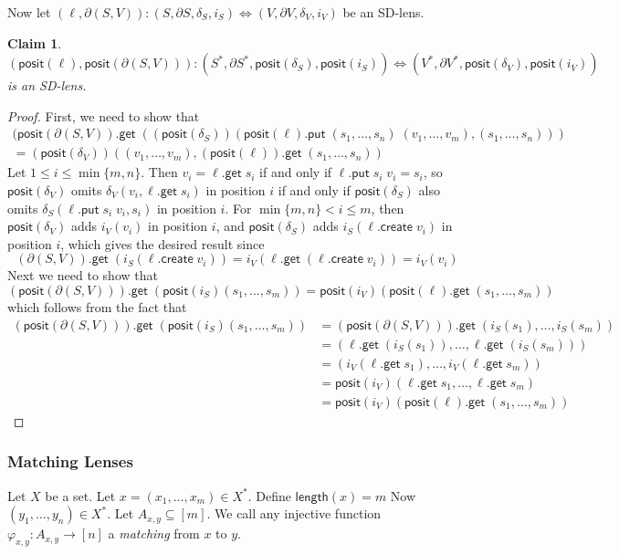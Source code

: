 \documentclass[acmsmall,review,anonymous]{acmart}\settopmatter{printfolios=true,printccs=false,printacmref=false}
\newtheorem{claim}{Claim}
\newcommand{\kw}[1]{\ensuremath{\mathsf{#1}}}
\newcommand{\get}{\ensuremath{\kw{get}}}
\newcommand{\pput}{\ensuremath{\kw{put}}}
\newcommand{\create}{\ensuremath{\kw{create}}}
\newcommand{\pos}{\ensuremath{\kw{posit}}}
\newcommand{\length}{\ensuremath{\kw{length}}}
\begin{document}
Now let $(\ell, \partial (S, V)) : (S, \partial S, \delta_{S}, i_{S})
\Leftrightarrow (V, \partial V, \delta_{V}, i_{V})$ be an SD-lens.
\begin{claim}\label{positionalisvalid}
$(\pos(\ell), \pos(\partial (S, V))) : (S^*, \partial S^*, \pos(\delta_{S}),
\pos(i_{S})) \Leftrightarrow (V^*, \partial V^*, \pos(\delta_{V}), \pos(i_{V}))$
is an SD-lens.
\end{claim}
\begin{proof}
First, we need to show that
\begin{multline}
(\pos(\partial (S, V)).\get \;
((\pos(\delta_S))(\pos(\ell).\pput \; (s_1, \ldots, s_n) \; (v_1, \ldots,
v_m), (s_1, \ldots, s_n))) \\
= (\pos(\delta_V))((v_1, \ldots, v_m), (\pos(\ell)).\get \; (s_1, \ldots, s_n))
\end{multline}
Let $1 \leq i \leq \min\{m, n\}$. Then $v_i = \ell.\get \; s_i$ if and only if
$\ell.\pput \; s_i \; v_i = s_i$, so $\pos(\delta_V)$ omits $\delta_V(v_i,
\ell.\get \; s_i)$ in position $i$ if and only if $\pos(\delta_S)$ also omits
$\delta_S(\ell.\pput \; s_i \; v_i, s_i)$ in position $i$. For $\min\{m,n\}
< i \leq m$, then $\pos(\delta_V)$ adds $i_V(v_i)$ in position $i$, and
$\pos(\delta_S)$ adds $i_S(\ell.\create \; v_i)$ in position $i$, which gives
the desired result since
$$(\partial (S, V)).\get \; (i_S(\ell.\create \; v_i)) = i_V(\ell.\get \;
(\ell.\create \; v_i)) = i_V(v_i)$$
Next we need to show that
$$(\pos(\partial (S, V))).\get \; ({\pos(i_S)}(s_1, \ldots, s_m)) =
\pos(i_V)(\pos(\ell).\get \; (s_1, \ldots, s_m))$$
which follows from the fact that
\begin{align*}
(\pos(\partial (S, V))).\get \; ({\pos(i_S)}(s_1, \ldots, s_m)) &=
(\pos(\partial (S, V))).\get \; ({i_S}(s_1), \ldots, {i_S}(s_m))\\
&= (\ell.\get \; (i_S(s_1)), \ldots, \ell.\get \; (i_S(s_m)))\\
&= (i_V(\ell.\get \; s_1), \ldots, i_V(\ell.\get \; s_m))\\
&= \pos(i_V)(\ell.\get \; s_1, \ldots, \ell.\get \; s_m)\\
&= \pos(i_V)(\pos(\ell).\get \; (s_1, \ldots, s_m))
\end{align*}
\end{proof}
\subsubsection{Matching Lenses}
Let $X$ be a set. Let $x = (x_1, \ldots, x_m) \in X^*$. Define $\length(x) = m$
Now $(y_1, \ldots, y_n) \in X^*$. Let $A_{x, y} \subseteq [m]$. We call any
injective function $\varphi_{x, y} : A_{x, y} \longrightarrow [n]$ a {\em
matching} from $x$ to $y$.
\end{document}
